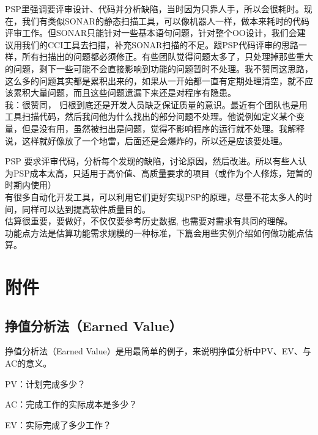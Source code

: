 {\begin{minipage}[t]{0.97\columnwidth}
PSP里强调要评审设计、代码并分析缺陷，当时因为只靠人手，所以会很耗时。现在，我们有类似SONAR的静态扫描工具，可以像机器人一样，做本来耗时的代码评审工作。但SONAR只能针对一些基本语句问题，针对整个OO设计，我们会建议用我们的CCI工具去扫描，补充SONAR扫描的不足。跟PSP代码评审的思路一样，所有扫描出的问题都必须修正。有些团队觉得问题太多了，只处理掉那些重大的问题，剩下一些可能不会直接影响到功能的问题暂时不处理。我不赞同这思路，这么多的问题其实都是累积出来的，如果从一开始都一直有定期处理清空，就不应该累积大量问题，而且这些问题遗漏下来还是对程序有隐患。\\
我：很赞同，
归根到底还是开发人员缺乏保证质量的意识。最近有个团队也是用工具扫描代码，然后我问他为什么找出的部分问题不处理。他说例如定义某个变量，但是没有用，虽然被扫出是问题，觉得不影响程序的运行就不处理。我解释说，这样就好像放了一个地雷，后面还是会爆炸的，所以还是应该要处理。
\strut
\end{minipage}}

PSP
要求评审代码，分析每个发现的缺陷，讨论原因，然后改进。所以有些人认为PSP成本太高，只适用于高价值、高质量要求的项目（或作为个人修炼，短暂的时期内使用）\\
有很多自动化开发工具，可以利用它们更好实现PSP的原理，尽量不花太多人的时间，同样可以达到提高软件质量目的。\\
估算很重要，要做好，不仅仅要参考历史数据, 也需要对需求有共同的理解。\\
功能点方法是估算功能需求规模的一种标准，下篇会用些实例介绍如何做功能点估算。

\hypertarget{ux9644ux4ef6}{%
\section{附件}\label{ux9644ux4ef6}}

\hypertarget{ux6323ux503cux5206ux6790ux6cd5earned-value}{%
\subsection{挣值分析法（Earned
Value）}\label{ux6323ux503cux5206ux6790ux6cd5earned-value}}

挣值分析法（Earned
Value）是用最简单的例子，来说明挣值分析中PV、EV、与AC的意义。

\begin{description}
\tightlist
\item[]
PV：计划完成多少？

AC：完成工作的实际成本是多少？

EV：实际完成了多少工作？
\end{description}

